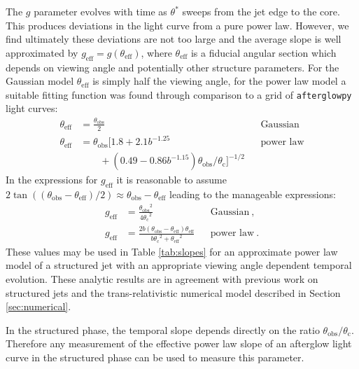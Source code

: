 \documentclass[twocolumn]{aastex62}
\newcommand{\afterglowpy}{{\tt afterglowpy}}
\newcommand{\thobs}{\ensuremath{\theta_{\mathrm{obs}}}}
\newcommand{\thC}{\ensuremath{\theta_{\mathrm{c}}}}
\newcommand{\geff}{\ensuremath{g_{\mathrm{eff}}}}
\newcommand{\theff}{\ensuremath{\theta_{\mathrm{eff}}}}
\begin{document}
The $g$ parameter evolves with time as $\theta^*$ sweeps from the jet edge to the core.  This produces deviations in the light curve from a pure power law.  However, we find ultimately these deviations are not too large and the average slope is well approximated by $\geff  = g(\theff)$, where $\theff$ is a fiducial angular section which depends on viewing angle and potentially other structure parameters.  For the Gaussian model $\theff$ is simply half the viewing angle, for the power law model a suitable fitting function was found through comparison to a grid of \afterglowpy{} light curves:
\begin{align}
	\theff &= \frac{\thobs}{2}&& \text{Gaussian} \\
	\theff &= \thobs \big [1.8+2.1b^{-1.25}  && \text{power law} \nonumber  \\
	 	& \qquad + (0.49-0.86b^{-1.15}) \thobs/\thC \big ] ^{-1/2} &&\label{eq:theff}
\end{align}
In the expressions for $\geff$ it is reasonable to assume $2 \tan((\thobs-\theff)/2) \approx \thobs-\theff$ leading to the manageable expressions:
\begin{align}
	\geff &= \frac{\thobs^2}{4\thC^2} && \text{Gaussian}\ , \\
	\geff &= \frac{2 b (\thobs-\theff)\theff}{b \thC^2+\theff^2} && \text{power law}\ . \label{eq:geff}
\end{align}
These values may be used in Table \ref{tab:slopes} for an approximate power law model of a structured jet with an appropriate viewing angle dependent temporal evolution.  These analytic results are in agreement with previous work on structured jets \citep{Rossi:2004aa} and the trans-relativistic numerical model described in Section \ref{sec:numerical}.

In the structured phase, the temporal slope depends directly on the ratio $\thobs/\thC$.  Therefore any measurement of the effective power law slope of an afterglow light curve in the structured phase can be used to measure this parameter.
\end{document}
